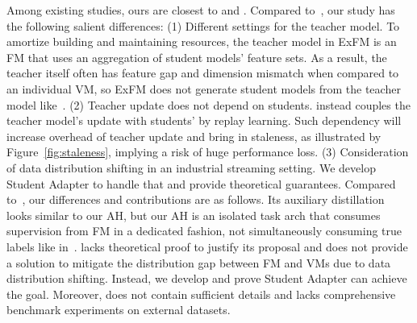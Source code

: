 Among existing studies, ours are closest to \cite{lee2024continual} and \cite{khani2024bridging}.
Compared to~\cite{lee2024continual}, our study has the following salient differences: (1) Different settings for the teacher model. To amortize building and maintaining resources, the teacher model in ExFM is an FM that uses an aggregation of student models' feature sets. As a result, the teacher itself often has feature gap and dimension mismatch when compared to an individual VM, so ExFM does not generate student models from the teacher model like~\cite{lee2024continual}. (2) Teacher update does not depend on students. \cite{lee2024continual} instead couples the teacher model’s update with students' by replay learning. Such dependency will increase overhead of teacher update and bring in staleness, as illustrated by Figure~\ref{fig:staleness}, implying a risk of huge performance loss. (3) Consideration of data distribution shifting in an industrial streaming setting. We develop Student Adapter to handle that and provide theoretical guarantees. 
Compared to~\cite{khani2024bridging}, our differences and contributions are as follows. 
Its auxiliary distillation looks similar to our AH, but our AH is an isolated task arch that consumes supervision from FM in a dedicated fashion, not simultaneously consuming true labels like in~\cite{khani2024bridging}. 
\cite{khani2024bridging} lacks theoretical proof to justify its proposal and does not provide a solution to mitigate the distribution gap between FM and VMs due to data distribution shifting. 
Instead, we develop and prove Student Adapter can achieve the goal. 
Moreover, \cite{khani2024bridging} does not contain sufficient details and lacks comprehensive benchmark experiments on external datasets.